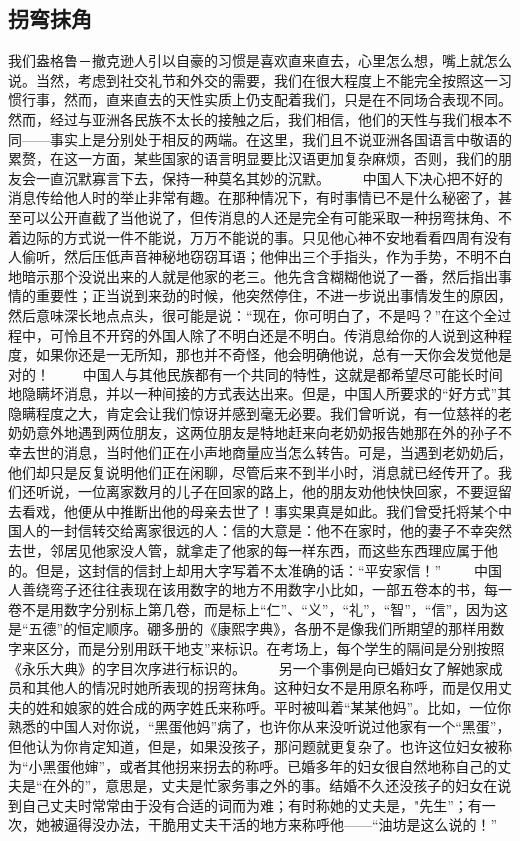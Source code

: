 \documentclass[12pt,oneside]{book}
\begin{document}
\begin{common-format}
\chapter{拐弯抹角}
我们盎格鲁－撤克逊人引以自豪的习惯是喜欢直来直去，心里怎么想，嘴上就怎么说。当然，考虑到社交礼节和外交的需要，我们在很大程度上不能完全按照这一习惯行事，然而，直来直去的天性实质上仍支配着我们，只是在不同场合表现不同。然而，经过与亚洲各民族不太长的接触之后，我们相信，他们的天性与我们根本不同——事实上是分别处于相反的两端。在这里，我们且不说亚洲各国语言中敬语的累赘，在这一方面，某些国家的语言明显要比汉语更加复杂麻烦，否则，我们的朋友会一直沉默寡言下去，保持一种莫名其妙的沉默。 
　　中国人下决心把不好的消息传给他人时的举止非常有趣。在那种情况下，有时事情已不是什么秘密了，甚至可以公开直截了当他说了，但传消息的人还是完全有可能采取一种拐弯抹角、不着边际的方式说一件不能说，万万不能说的事。只见他心神不安地看看四周有没有人偷听，然后压低声音神秘地窃窃耳语；他伸出三个手指头，作为手势，不明不白地暗示那个没说出来的人就是他家的老三。他先含含糊糊他说了一番，然后指出事情的重要性；正当说到来劲的时候，他突然停住，不进一步说出事情发生的原因，然后意味深长地点点头，很可能是说：“现在，你可明白了，不是吗？”在这个全过程中，可怜且不开窍的外国人除了不明白还是不明白。传消息给你的人说到这种程度，如果你还是一无所知，那也并不奇怪，他会明确他说，总有一天你会发觉他是对的！ 
　　中国人与其他民族都有一个共同的特性，这就是都希望尽可能长时间地隐瞒坏消息，并以一种间接的方式表达出来。但是，中国人所要求的“好方式”其隐瞒程度之大，肯定会让我们惊讶并感到毫无必要。我们曾听说，有一位慈祥的老奶奶意外地遇到两位朋友，这两位朋友是特地赶来向老奶奶报告她那在外的孙子不幸去世的消息，当时他们正在小声地商量应当怎么转告。可是，当遇到老奶奶后，他们却只是反复说明他们正在闲聊，尽管后来不到半小时，消息就已经传开了。我们还听说，一位离家数月的儿子在回家的路上，他的朋友劝他快快回家，不要逗留去看戏，他便从中推断出他的母亲去世了！事实果真是如此。我们曾受托将某个中国人的一封信转交给离家很远的人：信的大意是：他不在家时，他的妻子不幸突然去世，邻居见他家没人管，就拿走了他家的每一样东西，而这些东西理应属于他的。但是，这封信的信封上却用大字写着不太准确的话：“平安家信！” 
　　中国人善绕弯子还往往表现在该用数字的地方不用数字小比如，一部五卷本的书，每一卷不是用数字分别标上第几卷，而是标上“仁”、“义”，“礼”，“智”，“信”，因为这是“五德”的恒定顺序。硼多册的《康熙字典》，各册不是像我们所期望的那样用数字来区分，而是分别用跃干地支”来标识。在考场上，每个学生的隔间是分别按照《永乐大典》的字目次序进行标识的。 
　　另一个事例是向已婚妇女了解她家成员和其他人的情况时她所表现的拐弯抹角。这种妇女不是用原名称呼，而是仅用丈夫的姓和娘家的姓合成的两字姓氏来称呼。平时被叫着“某某他妈”。比如，一位你熟悉的中国人对你说，“黑蛋他妈”病了，也许你从来没听说过他家有一个“黑蛋”，但他认为你肯定知道，但是，如果没孩子，那问题就更复杂了。也许这位妇女被称为“小黑蛋他婶”，或者其他拐来拐去的称呼。已婚多年的妇女很自然地称自己的丈夫是“在外的”，意思是，丈夫是忙家务事之外的事。结婚不久还没孩子的妇女在说到自己丈夫时常常由于没有合适的词而为难；有时称她的丈夫是，"先生”；有一次，她被逼得没办法，干脆用丈夫干活的地方来称呼他——“油坊是这么说的！” 

\end{common-format}
\end{document}

